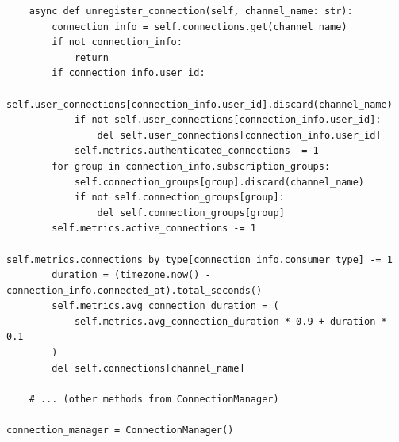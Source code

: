 \documentclass[12pt]{article}
\begin{document}
\begin{verbatim}
    async def unregister_connection(self, channel_name: str):
        connection_info = self.connections.get(channel_name)
        if not connection_info:
            return
        if connection_info.user_id:
            self.user_connections[connection_info.user_id].discard(channel_name)
            if not self.user_connections[connection_info.user_id]:
                del self.user_connections[connection_info.user_id]
            self.metrics.authenticated_connections -= 1
        for group in connection_info.subscription_groups:
            self.connection_groups[group].discard(channel_name)
            if not self.connection_groups[group]:
                del self.connection_groups[group]
        self.metrics.active_connections -= 1
        self.metrics.connections_by_type[connection_info.consumer_type] -= 1
        duration = (timezone.now() - connection_info.connected_at).total_seconds()
        self.metrics.avg_connection_duration = (
            self.metrics.avg_connection_duration * 0.9 + duration * 0.1
        )
        del self.connections[channel_name]
        
    # ... (other methods from ConnectionManager)

connection_manager = ConnectionManager()
\end{verbatim}
\end{document}
